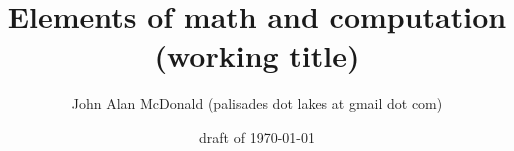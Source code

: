\documentclass{PalisadesLakesBook}
\title{Elements of math and computation (working title)}
\author{John Alan McDonald 
(palisades dot lakes at gmail dot com)}
\date{draft of \today}
\begin{document}
\maketitle
\PalisadesLakesTableOfContents

\end{document}
